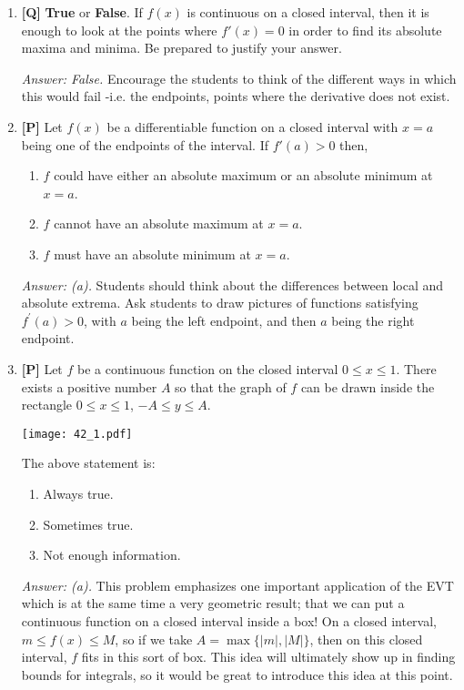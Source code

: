 \documentclass[12pt]{article}
\begin{document}
\begin{enumerate}

\item {\bf [Q]}
\textbf{True} or \textbf{False}. If $f(x)$ is continuous on
a closed interval, then it is enough to look at the points where
$f'(x)=0$ in order to find its absolute maxima and minima. Be
prepared to justify your answer.

{\it Answer: False.} Encourage the students to think of the
different ways in which this would fail -i.e. the endpoints, points where
the derivative does not exist.

\bigskip

\item {\bf [P]}
Let $f(x)$ be a differentiable function on
a closed interval with $x=a$ being one of the endpoints of the
interval. If $f'(a)>0$ then,
\begin{enumerate}
\item $f$ could have either an absolute maximum or an absolute
minimum at $x=a$.
\item $f$ cannot have an absolute maximum at $x=a$.
\item $f$ must have an absolute minimum at $x=a$.
\end{enumerate}

{\it Answer: (a).} Students should think about the
differences between local and absolute extrema. Ask students to draw pictures 
of functions satisfying $f^{\prime}(a)>0$, with $a$ being the left endpoint, and then 
$a$ being the right endpoint.

\bigskip

\item {\bf [P]} Let $f$ be a continuous function on the closed interval
$0\leq x\leq 1$. There exists a positive number $A$ so that
the graph of $f$ can be drawn inside the rectangle $0\leq x\leq
1$, $-A\leq y\leq A$.

\begin{center}
\texttt{[image: 42\_1.pdf]}
\end{center}

The above statement is:
\begin{enumerate}
\item Always true.
\item Sometimes true.
\item Not enough information.
\end{enumerate}

{\it Answer: (a).} This problem emphasizes one important
application of the EVT which is at the same time a very geometric
result; that we can put a continuous function on a closed interval
inside a box! On a closed interval, $m\le f(x) \le M$, so if we take 
$A=\max \{|m|,|M|\}$, then on this closed interval, $f$ fits in this sort of box.
This idea will ultimately show up in finding bounds for
integrals, so it would be great to introduce this idea at this
point. 


\end{enumerate}
\end{document}
